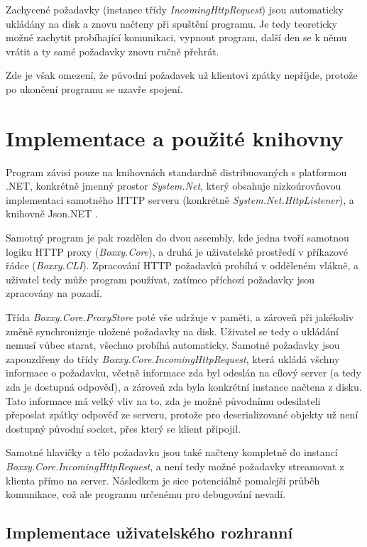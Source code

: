 \documentclass{article}
\begin{document}
Zachycené požadavky (instance třídy \emph{IncomingHttpRequest}) jsou automaticky ukládány na disk a znovu načteny při spuštění programu. Je tedy teoreticky možné zachytit probíhající komunikaci, vypnout program, další den se k němu vrátit a ty samé požadavky znovu ručně přehrát.

Zde je však omezení, že původní požadavek už klientovi zpátky nepříjde, protože po ukončení programu se uzavře spojení.

\section{Implementace a použité knihovny}

Program závisí pouze na knihovnách standardně distribuovaných s platformou .NET, konkrétně jmenný prostor \emph{System.Net}, který obsahuje nizkoúrovňovou implementaci samotného HTTP serveru (konkrétně \emph{System.Net.HttpListener}), a knihovně Json.NET \cite{newtonsoft}.

Samotný program je pak rozdělen do dvou assembly, kde jedna tvoří samotnou logiku HTTP proxy (\emph{Boxxy.Core}), a druhá je uživatelské prostředí v příkazové řádce (\emph{Boxxy.CLI}). Zpracování HTTP požadavků probíhá v odděleném vlákně, a uživatel tedy může program používat, zatímco příchozí požadavky jsou zpracovány na pozadí.

Třída \emph{Boxxy.Core.ProxyStore} poté vše udržuje v paměti, a zároveň při jakékoliv změně synchronizuje uložené požadavky na disk. Uživatel se tedy o ukládání nemusí vůbec starat, všechno probíhá automaticky. Samotné požadavky jsou zapouzdřeny do třídy \emph{Boxxy.Core.IncomingHttpRequest}, která ukládá všchny informace o požadavku, včetně informace zda byl odeslán na cílový server (a tedy zda je dostupná odpověď), a zároveň zda byla konkrétní instance načtena z disku. Tato informace má velký vliv na to, zda je možné původnímu odesilateli přeposlat zpátky odpověď ze serveru, protože pro deserializované objekty už není dostupný původní socket, přes který se klient připojil.

Samotné hlavičky a tělo požadavku jsou také načteny kompletně do instancí \emph{Boxxy.Core.IncomingHttpRequest}, a není tedy možné požadavky streamovat z klienta přímo na server. Následkem je sice potenciálně pomalejší průběh komunikace, což ale programu určenému pro debugování nevadí.

\subsection{Implementace uživatelského rozhranní}
\end{document}
